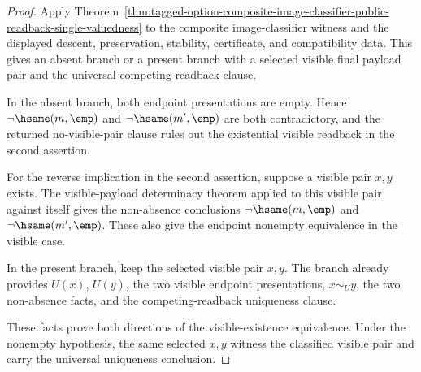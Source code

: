 \begin{proof}
Apply
Theorem~\ref{thm:tagged-option-composite-image-classifier-public-readback-single-valuedness}
to the composite image-classifier witness and the displayed descent,
preservation, stability, certificate, and compatibility data. This gives an
absent branch or a present branch with a selected visible final payload pair and
the universal competing-readback clause.

In the absent branch, both endpoint presentations are empty. Hence
$\neg\hsame(m,\emp)$ and $\neg\hsame(m',\emp)$ are both contradictory, and the
returned no-visible-pair clause rules out the existential visible readback in
the second assertion.

For the reverse implication in the second assertion, suppose a visible pair
$x,y$ exists. The visible-payload determinacy theorem applied to this visible
pair against itself gives the non-absence conclusions
$\neg\hsame(m,\emp)$ and $\neg\hsame(m',\emp)$. These also give the endpoint
nonempty equivalence in the visible case.

In the present branch, keep the selected visible pair $x,y$. The branch already
provides $U(x)$, $U(y)$, the two visible endpoint presentations, $x\sim_U y$,
the two non-absence facts, and the competing-readback uniqueness clause.

These facts prove both directions of the visible-existence equivalence. Under
the nonempty hypothesis, the same selected $x,y$ witness the classified visible
pair and carry the universal uniqueness conclusion.
\end{proof}

